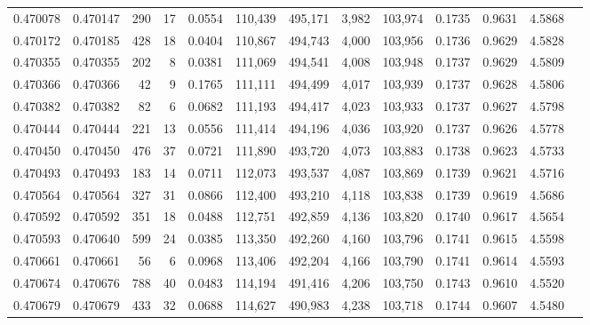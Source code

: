 \begin{tabular}{rrrrrrrrrrrrr}
0.470078 & 0.470147 &   290 &    17 &                                     0.0554 & 110,439 & 495,171 &   3,982 & 103,974 & 0.1735 & 0.9631 & 4.5868 \\
0.470172 & 0.470185 &   428 &    18 &                                     0.0404 & 110,867 & 494,743 &   4,000 & 103,956 & 0.1736 & 0.9629 & 4.5828 \\
0.470355 & 0.470355 &   202 &     8 &                                     0.0381 & 111,069 & 494,541 &   4,008 & 103,948 & 0.1737 & 0.9629 & 4.5809 \\
0.470366 & 0.470366 &    42 &     9 &                                     0.1765 & 111,111 & 494,499 &   4,017 & 103,939 & 0.1737 & 0.9628 & 4.5806 \\
0.470382 & 0.470382 &    82 &     6 &                                     0.0682 & 111,193 & 494,417 &   4,023 & 103,933 & 0.1737 & 0.9627 & 4.5798 \\
0.470444 & 0.470444 &   221 &    13 &                                     0.0556 & 111,414 & 494,196 &   4,036 & 103,920 & 0.1737 & 0.9626 & 4.5778 \\
0.470450 & 0.470450 &   476 &    37 &                                     0.0721 & 111,890 & 493,720 &   4,073 & 103,883 & 0.1738 & 0.9623 & 4.5733 \\
0.470493 & 0.470493 &   183 &    14 &                                     0.0711 & 112,073 & 493,537 &   4,087 & 103,869 & 0.1739 & 0.9621 & 4.5716 \\
0.470564 & 0.470564 &   327 &    31 &                                     0.0866 & 112,400 & 493,210 &   4,118 & 103,838 & 0.1739 & 0.9619 & 4.5686 \\
0.470592 & 0.470592 &   351 &    18 &                                     0.0488 & 112,751 & 492,859 &   4,136 & 103,820 & 0.1740 & 0.9617 & 4.5654 \\
0.470593 & 0.470640 &   599 &    24 &                                     0.0385 & 113,350 & 492,260 &   4,160 & 103,796 & 0.1741 & 0.9615 & 4.5598 \\
0.470661 & 0.470661 &    56 &     6 &                                     0.0968 & 113,406 & 492,204 &   4,166 & 103,790 & 0.1741 & 0.9614 & 4.5593 \\
0.470674 & 0.470676 &   788 &    40 &                                     0.0483 & 114,194 & 491,416 &   4,206 & 103,750 & 0.1743 & 0.9610 & 4.5520 \\
0.470679 & 0.470679 &   433 &    32 &                                     0.0688 & 114,627 & 490,983 &   4,238 & 103,718 & 0.1744 & 0.9607 & 4.5480 \\

\end{tabular}
